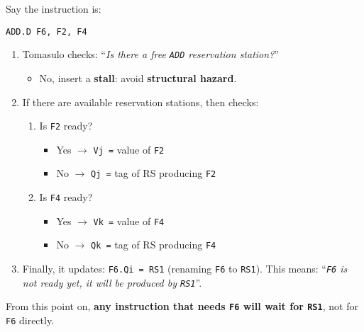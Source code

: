 \begin{examplebox}
    Say the instruction is:
    \begin{lstlisting}[language=unknown]
ADD.D F6, F2, F4\end{lstlisting}
    \begin{enumerate}
        \item Tomasulo checks: ``\emph{Is there a free \texttt{ADD} reservation station?}''
        \begin{itemize}
            \item[\textcolor{Red2}{\faIcon{times}}] No, insert a \textbf{stall}: avoid \textbf{structural hazard}.
        \end{itemize}

        \item[\textcolor{Green3}{\faIcon{check}}] If there are available reservation stations, then checks:
        \begin{enumerate}
            \item Is \texttt{F2} ready?
            \begin{itemize}
                \item[\textcolor{Green3}{\faIcon{check}}] Yes $\rightarrow$ \texttt{Vj =} value of \texttt{F2}
                \item[\textcolor{Red2}{\faIcon{times}}] No $\rightarrow$ \texttt{Qj =} tag of RS producing \texttt{F2}
            \end{itemize}

            \item Is \texttt{F4} ready?
            \begin{itemize}
                \item[\textcolor{Green3}{\faIcon{check}}] Yes $\rightarrow$ \texttt{Vk =} value of \texttt{F4}
                \item[\textcolor{Red2}{\faIcon{times}}] No $\rightarrow$ \texttt{Qk =} tag of RS producing \texttt{F4}
            \end{itemize}
        \end{enumerate}

        \item Finally, it updates: \texttt{F6.Qi = RS1} (renaming \texttt{F6} to \texttt{RS1}). This means: ``\emph{\texttt{F6} is not ready yet, it will be produced by \texttt{RS1}}''.
    \end{enumerate}
    From this point on, \textbf{any instruction that needs \texttt{F6} will wait for \texttt{RS1}}, not for \texttt{F6} directly.


\end{examplebox}

